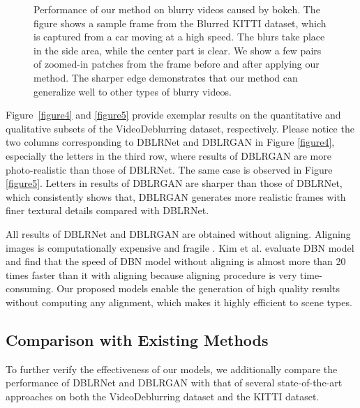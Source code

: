 \documentclass[journal]{IEEEtran}
\begin{document}
\begin{figure*}[tb]
\centering
{}
\caption{Performance of our method on blurry videos caused by bokeh. The figure shows a sample frame from the Blurred KITTI dataset, which is captured from a car moving at a high speed. The blurs take place in the side area, while the center part is clear. We show a few pairs of zoomed-in patches from the frame before and after applying our method. The sharper edge demonstrates that our method can generalize well to other types of blurry videos.}
 \label{figure6}
\end{figure*}



Figure~\ref{figure4} and \ref{figure5} provide exemplar results on the quantitative and qualitative subsets of the VideoDeblurring dataset, respectively. Please notice the two columns corresponding to DBLRNet and DBLRGAN in Figure \ref{figure4}, especially the letters in the third row, where results of DBLRGAN are more photo-realistic than those of DBLRNet. The same case is observed in Figure \ref{figure5}. Letters in results of DBLRGAN are sharper than those of DBLRNet, which consistently shows that, DBLRGAN generates more realistic frames with finer textural details compared with DBLRNet.

All results of DBLRNet and DBLRGAN are obtained without aligning. Aligning images is computationally expensive and fragile \cite{su2016deep}. Kim et al. \cite{kim2017online} evaluate DBN model and find that the speed of DBN model without aligning is almost more than 20 times faster than it with aligning because aligning procedure is very time-consuming. Our proposed models enable the generation of high quality results without computing any alignment, which makes it highly efficient to scene types.


\subsection{Comparison with Existing Methods} 
To further verify the effectiveness of our models, we additionally compare the performance of DBLRNet and DBLRGAN with that of several state-of-the-art approaches on both the VideoDeblurring dataset and the KITTI dataset. 
\end{document}
